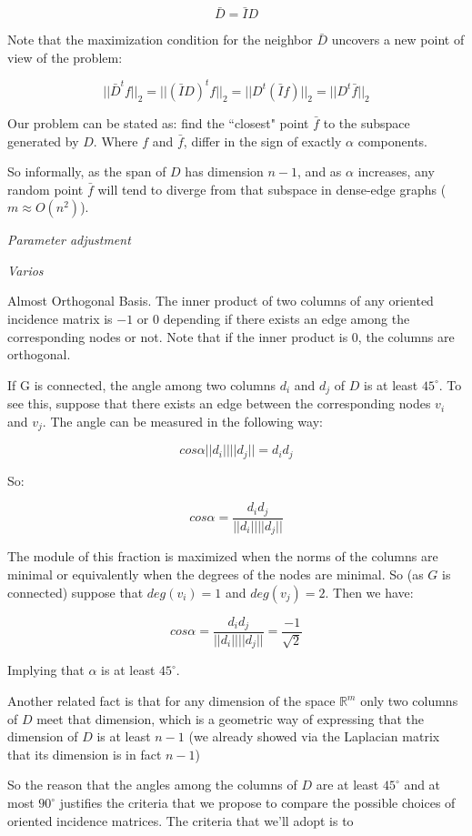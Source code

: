 \documentclass[a4paper,11pt]{article}
\begin{document}
$$\bar{D} = \bar{I} D$$

Note that the maximization condition for the neighbor $\bar{D}$ uncovers 
a new point of view of the problem:

$$||\bar{D}^tf||_2 = ||(\bar{I} D)^t f||_2 = ||D^t (\bar{I} f)||_2 = 
||D^t \bar{f}||_2$$

Our problem can be stated as: find the ``closest" point $\bar{f}$ to 
the subspace generated by $D$. Where $f$ and $\bar{f}$, differ in the 
sign of exactly $\alpha$ components.

\bigskip

So informally, as the span of $D$ has dimension $n-1$, and as $\alpha$ 
increases, any random point $\bar{f}$ will tend to diverge from that 
subspace in dense-edge graphs ($m \approx O(n^2)$).

\bigskip

\emph{Parameter adjustment}

\bigskip

\emph{Varios}

\bigskip

Almost Orthogonal Basis. The inner product of two columns of any oriented 
incidence matrix is $-1$ or $0$ depending if there exists an edge among
the corresponding nodes or not. Note that if the inner product is $0$, 
the columns are orthogonal.

\bigskip

If G is connected, the angle among two columns $d_i$ and $d_j$ of $D$ is 
at least $45^{\circ}$. To see this, suppose that there exists an edge 
between the corresponding nodes $v_i$ and $v_j$. The angle can be 
measured in the following way:

$$cos \alpha ||d_i|| ||d_j||= d_i  d_j$$

So: 

$$cos \alpha = \frac{d_i d_j}{||d_i|| ||d_j||}$$

The module of this fraction is maximized when the norms of the columns 
are minimal or equivalently when the degrees of the nodes are minimal. So 
(as $G$ is connected) suppose that $deg(v_i) = 1$ and $deg(v_j)=2$. Then 
we have:

$$cos \alpha = \frac{d_i d_j}{||d_i|| ||d_j||} = \frac{-1}{\sqrt{2}}$$

\bigskip

Implying that $\alpha$ is at least $45^{\circ}$.

\bigskip
Another related fact is that for any dimension of the space 
$\mathbb{R}^m$ only two columns of $D$ meet that dimension, which 
is a geometric way of expressing that the dimension of $D$ is at least 
$n-1$ (we already showed via the Laplacian matrix that its dimension is 
in fact $n-1$)

\bigskip

So the reason that the angles among the columns of $D$ are at least 
$45^{\circ}$ and at most $90^{\circ}$ justifies the criteria that we 
propose to compare the possible choices of oriented incidence matrices.
The criteria that we'll adopt is to 
\end{document}

